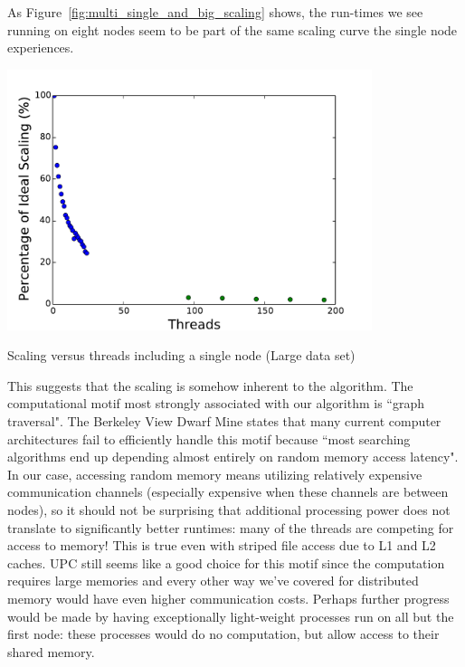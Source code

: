 \documentclass{article}
\begin{document}
As Figure~\ref{fig:multi_single_and_big_scaling} shows, the run-times we see running on eight nodes seem to be part of the same scaling curve the single node experiences.

\begin{minipage}{\linewidth}
  \captionsetup{type=figure}
  \begin{center}
  \includegraphics[width=0.8\textwidth]{MultiANDSingleBIGScaling.pdf}
  \end{center}
  \caption{Scaling versus threads including a single node (Large data set)} \label{fig:multi_single_and_big_scaling}
\end{minipage}

This suggests that the scaling is somehow inherent to the algorithm. The computational motif most strongly associated with our algorithm is ``graph traversal". The Berkeley View Dwarf Mine states that many current computer architectures fail to efficiently handle this motif because ``most searching algorithms end up depending almost entirely on random memory access latency". In our case, accessing random memory means utilizing relatively expensive communication channels (especially expensive when these channels are between nodes), so it should not be surprising that additional processing power does not translate to significantly better runtimes: many of the threads are competing for access to memory! This is true even with striped file access due to L1 and L2 caches. UPC still seems like a good choice for this motif since the computation requires large memories and every other way we've covered for distributed memory would have even higher communication costs. Perhaps further progress would be made by having exceptionally light-weight processes run on all but the first node: these processes would do no computation, but allow access to their shared memory.
\end{document}
